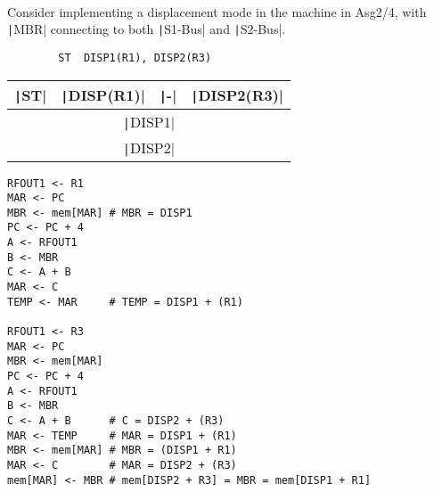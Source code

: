 \documentclass[answers]{exam}
\begin{document}
\begin{questions}
    \newpage

     \\
    Consider implementing a displacement mode in the machine in Asg2/4, with \texttt|MBR| connecting to both \texttt|S1-Bus| and \texttt|S2-Bus|.

    \begin{center}
        \begin{verbatim}
        ST  DISP1(R1), DISP2(R3)
        \end{verbatim}
    \end{center}

    \begin{table}[htb]
        \centering
        \setlength{\tabcolsep}{30pt}
        \begin{tabular}{|c|c|c|c|}
            \hline
            \texttt|ST|
             & \texttt|DISP(R1)|
             & \texttt|-|
             & \texttt|DISP2(R3)|                     \\ \hline\hline
            \multicolumn{4}{|c|}{\texttt|DISP1|}      \\ \hline
            \multicolumn{4}{|c|}{\texttt|DISP2|}      \\ \hline
        \end{tabular}
    \end{table}

    \begin{solution}
        \begin{verbatim}
RFOUT1 <- R1
MAR <- PC
MBR <- mem[MAR] # MBR = DISP1
PC <- PC + 4
A <- RFOUT1
B <- MBR
C <- A + B
MAR <- C
TEMP <- MAR     # TEMP = DISP1 + (R1)

RFOUT1 <- R3
MAR <- PC
MBR <- mem[MAR]
PC <- PC + 4
A <- RFOUT1
B <- MBR
C <- A + B      # C = DISP2 + (R3)
MAR <- TEMP     # MAR = DISP1 + (R1)
MBR <- mem[MAR] # MBR = (DISP1 + R1)
MAR <- C        # MAR = DISP2 + (R3)
mem[MAR] <- MBR # mem[DISP2 + R3] = MBR = mem[DISP1 + R1]
        \end{verbatim}
    \end{solution}

\end{questions}
\end{document}
